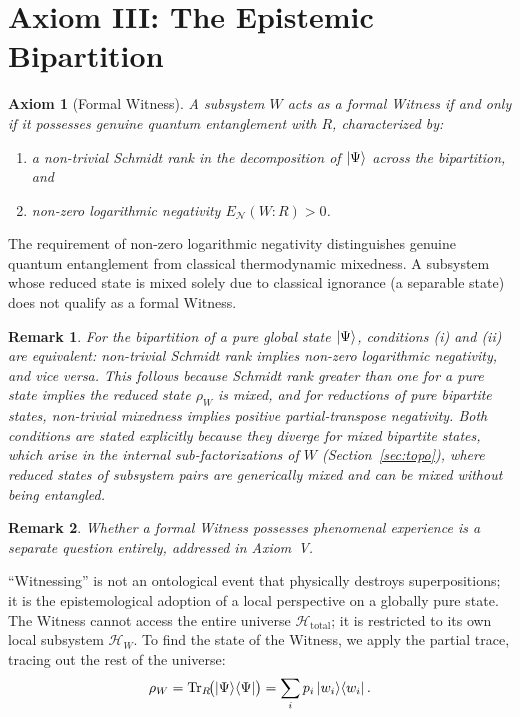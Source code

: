 \documentclass[12pt, a4paper]{article}
\newtheorem{axiom}{Axiom}
\newtheorem{remark}{Remark}
\begin{document}
\section{Axiom III: The Epistemic Bipartition}
\label{sec:axiom3}

\begin{axiom}[Formal Witness]
A subsystem $W$ acts as a \emph{formal Witness} if and only if it possesses genuine quantum entanglement with $R$, characterized by:
\begin{enumerate}[label=(\roman*)]
    \item a non-trivial Schmidt rank in the decomposition of $\ket{\Psi}$ across the bipartition, and
    \item non-zero logarithmic negativity $E_{\mathcal{N}}(W{:}R) > 0$.
\end{enumerate}
\end{axiom}

The requirement of non-zero logarithmic negativity distinguishes genuine quantum entanglement from classical thermodynamic mixedness. A subsystem whose reduced state is mixed solely due to classical ignorance (a separable state) does not qualify as a formal Witness.

\begin{remark}
For the bipartition of a pure global state $\ket{\Psi}$, conditions (i) and (ii) are equivalent: non-trivial Schmidt rank implies non-zero logarithmic negativity, and vice versa. This follows because Schmidt rank greater than one for a pure state implies the reduced state $\rho_W$ is mixed, and for reductions of pure bipartite states, non-trivial mixedness implies positive partial-transpose negativity. Both conditions are stated explicitly because they diverge for \emph{mixed} bipartite states, which arise in the internal sub-factorizations of $W$ (Section~\ref{sec:topo}), where reduced states of subsystem pairs are generically mixed and can be mixed without being entangled.
\end{remark}

\begin{remark}
Whether a formal Witness possesses \emph{phenomenal experience} is a separate question entirely, addressed in Axiom~V.
\end{remark}

``Witnessing'' is not an ontological event that physically destroys superpositions; it is the epistemological adoption of a local perspective on a globally pure state. The Witness cannot access the entire universe $\mathcal{H}_{\mathrm{total}}$; it is restricted to its own local subsystem $\mathcal{H}_W$. To find the state of the Witness, we apply the partial trace, tracing out the rest of the universe:
\begin{equation}
\rho_W = \operatorname{Tr}_R\!\bigl(\ket{\Psi}\!\bra{\Psi}\bigr) = \sum_i p_i \ket{w_i}\!\bra{w_i}.
\label{eq:rhoW}
\end{equation}
\end{document}
